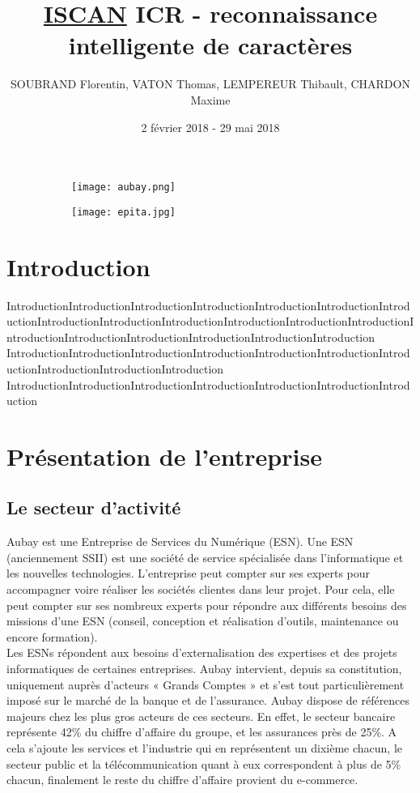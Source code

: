 \documentclass[12pt,a4paper]{article}
\title{\textbf { \huge{\underline{ISCAN}} \bigbreak  \large{ICR - reconnaissance intelligente de caractères}}}
\author{SOUBRAND Florentin, VATON Thomas, LEMPEREUR Thibault, CHARDON Maxime}
\date {2 février 2018 - 29 mai 2018}
\begin{document}
\pagestyle{fancy}

\maketitle
\begin{figure}[!h]
    \centering
    \begin{subfigure}{.49\textwidth}
      \centering
    \texttt{[image: aubay.png]}
    \end{subfigure}
    \begin{subfigure}{.49\textwidth}
      \centering
      \texttt{[image: epita.jpg]}
    \end{subfigure}
\end{figure}

\newpage
\thispagestyle{empty}
\tableofcontents

\newpage
{}
\section{Introduction}
IntroductionIntroductionIntroductionIntroductionIntroductionIntroductionIntroductionIntroductionIntroductionIntroductionIntroductionIntroductionIntroductionIntroductionIntroductionIntroductionIntroductionIntroductionIntroduction
IntroductionIntroductionIntroductionIntroductionIntroductionIntroductionIntroductionIntroductionIntroductionIntroduction
IntroductionIntroductionIntroductionIntroductionIntroductionIntroductionIntroduction


\newpage

\section{Présentation de l'entreprise}
\subsection{Le secteur d'activité}
Aubay est une Entreprise de Services du Numérique (ESN). Une ESN (anciennement SSII) est une société de service spécialisée dans l'informatique et les nouvelles technologies. L'entreprise peut compter sur ses experts pour accompagner voire réaliser les sociétés clientes dans leur projet. Pour cela, elle peut compter sur ses nombreux experts pour répondre aux différents besoins des missions d'une ESN (conseil, conception et réalisation d’outils, maintenance ou encore formation).\\
Les ESNs répondent aux besoins d'externalisation des expertises et des projets informatiques de certaines entreprises.
\bigbreak
Aubay intervient, depuis sa constitution, uniquement auprès d’acteurs « Grands Comptes » et s’est tout particulièrement imposé sur le marché de la banque et de l’assurance. Aubay dispose de références majeurs chez les plus gros acteurs de ces secteurs. En effet, le secteur bancaire représente 42\% du chiffre d’affaire du groupe, et les assurances près de 25\%. A cela s’ajoute les services et l’industrie qui en représentent un dixième chacun, le secteur public et la télécommunication quant à eux correspondent à plus de 5\% chacun, finalement le reste du chiffre d’affaire provient du e-commerce.
\end{document}
